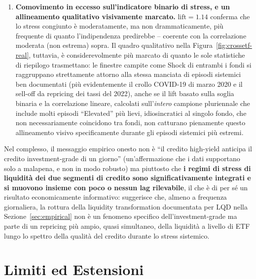 \documentclass[11pt]{article}
\theoremstyle{definition}
\theoremstyle{remark}
\begin{document}
\begin{enumerate}
    \item \textbf{Comovimento in eccesso sull'indicatore binario di stress, e un allineamento qualitativo visivamente marcato.} $\mathrm{lift}=1.14$ conferma che lo stress congiunto \`e moderatamente, ma non drammaticamente, pi\`u frequente di quanto l'indipendenza predirebbe -- coerente con la correlazione moderata (non estrema) sopra. Il quadro qualitativo nella Figura~\ref{fig:crossetf-real}, tuttavia, \`e considerevolmente pi\`u marcato di quanto le sole statistiche di riepilogo trasmettano: le finestre campite come Shock di entrambi i fondi si raggruppano strettamente attorno alla stessa manciata di episodi sistemici ben documentati (pi\`u evidentemente il crollo COVID-19 di marzo 2020 e il sell-off da repricing dei tassi del 2022), anche se il lift basato sulla soglia binaria e la correlazione lineare, calcolati sull'\emph{intero} campione pluriennale che include molti episodi ``Elevated'' pi\`u lievi, idiosincratici al singolo fondo, che non necessariamente coincidono tra fondi, non catturano pienamente questo allineamento visivo specificamente durante gli episodi sistemici pi\`u estremi.
\end{enumerate}

Nel complesso, il messaggio empirico onesto non \`e ``il credito high-yield anticipa il credito investment-grade di un giorno'' (un'affermazione che i dati supportano solo a malapena, e non in modo robusto) ma piuttosto che \textbf{i regimi di stress di liquidit\`a dei due segmenti di credito sono significativamente integrati e si muovono insieme con poco o nessun lag rilevabile}, il che \`e di per s\'e un risultato economicamente informativo: suggerisce che, almeno a frequenza giornaliera, la rottura della liquidity transformation documentata per LQD nella Sezione~\ref{sec:empirical} non \`e un fenomeno specifico dell'investment-grade ma parte di un repricing pi\`u ampio, quasi simultaneo, della liquidit\`a a livello di ETF lungo lo spettro della qualit\`a del credito durante lo stress sistemico.

\section{Limiti ed Estensioni}
\label{sec:limitations}
\end{document}
